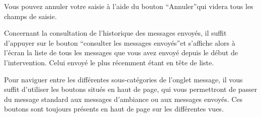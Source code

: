 \documentclass{article}
\begin{document}
Vous pouvez annuler votre saisie à l'aide du bouton ``Annuler''qui 
videra tous les champs de saisie.

Concernant la consultation de l'historique des messages envoyés, 
il suffit d'appuyer sur le bouton ``consulter les messages envoyés''et s'affiche 
alors à l'écran la liste de tous les messages que vous avez envoyé depuis le 
début de l'intervention. Celui envoyé le plus récemment étant en tête de liste. 


Pour naviguer entre les différentes sous-catégories de l'onglet 
message, il vous suffit d'utiliser les boutons situés en haut de page, qui vous 
permettront de passer du message standard aux messages d'ambiance ou aux messages 
envoyés.  Ces boutons sont toujours présents en haut de page sur les différentes 
vues.
\end{document}
